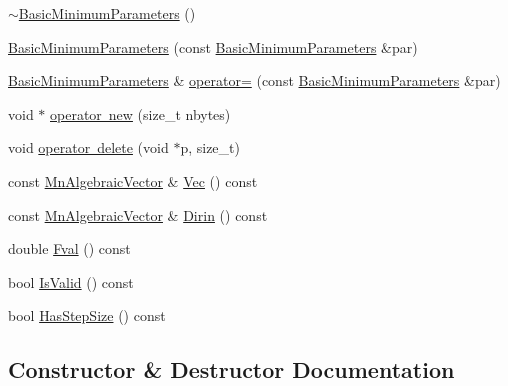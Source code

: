 \begin{DoxyCompactItemize}
\item 
\mbox{\hyperlink{classROOT_1_1Minuit2_1_1BasicMinimumParameters_a425049822924a832736afbf3b21dcdb6}{$\sim$\+Basic\+Minimum\+Parameters}} ()
\item 
\mbox{\hyperlink{classROOT_1_1Minuit2_1_1BasicMinimumParameters_a8714fc623b46e7f891748583ff7746b9}{Basic\+Minimum\+Parameters}} (const \mbox{\hyperlink{classROOT_1_1Minuit2_1_1BasicMinimumParameters}{Basic\+Minimum\+Parameters}} \&par)
\item 
\mbox{\hyperlink{classROOT_1_1Minuit2_1_1BasicMinimumParameters}{Basic\+Minimum\+Parameters}} \& \mbox{\hyperlink{classROOT_1_1Minuit2_1_1BasicMinimumParameters_a468d3eefd1f7080b499f090afdb3eab4}{operator=}} (const \mbox{\hyperlink{classROOT_1_1Minuit2_1_1BasicMinimumParameters}{Basic\+Minimum\+Parameters}} \&par)
\item 
void $\ast$ \mbox{\hyperlink{classROOT_1_1Minuit2_1_1BasicMinimumParameters_a5258a9959c0b6ff699a9200dad4caee0}{operator new}} (size\+\_\+t nbytes)
\item 
void \mbox{\hyperlink{classROOT_1_1Minuit2_1_1BasicMinimumParameters_aaaef6d3167e6f4a88182d6f171641fb9}{operator delete}} (void $\ast$p, size\+\_\+t)
\item 
const \mbox{\hyperlink{namespaceROOT_1_1Minuit2_a62ed97730a1ca8d3fbaec64a19aa11c9}{Mn\+Algebraic\+Vector}} \& \mbox{\hyperlink{classROOT_1_1Minuit2_1_1BasicMinimumParameters_ae8dc429aa9491e545efd916d4f72f8dd}{Vec}} () const
\item 
const \mbox{\hyperlink{namespaceROOT_1_1Minuit2_a62ed97730a1ca8d3fbaec64a19aa11c9}{Mn\+Algebraic\+Vector}} \& \mbox{\hyperlink{classROOT_1_1Minuit2_1_1BasicMinimumParameters_a4a4abef44e633bce699eb280228702e1}{Dirin}} () const
\item 
double \mbox{\hyperlink{classROOT_1_1Minuit2_1_1BasicMinimumParameters_a5d92e23ec6117dd29e3e7e2b62ebaf16}{Fval}} () const
\item 
bool \mbox{\hyperlink{classROOT_1_1Minuit2_1_1BasicMinimumParameters_a095b6bfb0949e1d64ef40a94c5d605d6}{Is\+Valid}} () const
\item 
bool \mbox{\hyperlink{classROOT_1_1Minuit2_1_1BasicMinimumParameters_a482374735681f4f24417e7cd1af044df}{Has\+Step\+Size}} () const
\end{DoxyCompactItemize}


\subsection{Constructor \& Destructor Documentation}
\mbox{\label{classROOT_1_1Minuit2_1_1BasicMinimumParameters_ac3a8db51a43b7f99f9e71dcfb9ca9009}} 
